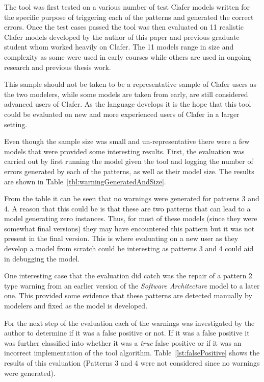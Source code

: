 \documentclass[10pt,oneside]{IEEEtran}
\begin{document}
The tool was first tested on a various number of test Clafer models written for the specific purpose of triggering each of the patterns and generated the correct errors. Once the test cases passed the tool was then evaluated on 11 realistic Clafer models developed by the author of this paper and previous graduate student whom worked heavily on Clafer. The 11 models range in size and complexity as some were used in early courses while others are used in ongoing research and previous thesis work.

This sample should not be taken to be a representative sample of Clafer users as the two modelers, while some models are taken from early, are still considered advanced users of Clafer. As the language develops it is the hope that this tool could be evaluated on new and more experienced users of Clafer in a larger setting.

Even though the sample size was small and un-representative there were a few models that were provided some interesting results. First, the evaluation was carried out by first running the model given the tool and logging the number of errors generated by each of the patterns, as well as their model size. The results are shown in Table~\ref{tbl:warningGeneratedAndSize}.

From the table it can be seen that no warnings were generated for patterns 3 and 4. A reason that this could be is that these are two patterns that can lead to a model generating zero instances. Thus, for most of these models (since they were somewhat final versions) they may have encountered this pattern but it was not present in the final version. This is where evaluating on a new user as they develop a model from scratch could be interesting as patterns 3 and 4 could aid in debugging the model.

One interesting case that the evaluation did catch was the repair of a pattern 2 type warning from an earlier version of the \textit{Software Architecture} model to a later one. This provided some evidence that these patterns are detected manually by modelers and fixed as the model is developed.

For the next step of the evaluation each of the warnings was investigated by the author to determine if it was a false positive or not. If it was a false positive it was further classified into whether it was a \textit{true} false positive or if it was an incorrect implementation of the tool algorithm. Table~\ref{lst:falsePositive} shows the results of this evaluation (Patterns 3 and 4 were not considered since no warnings were generated).
\end{document}
